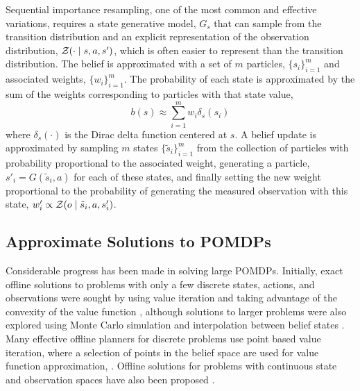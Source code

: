 Sequential importance resampling, one of the most common and effective variations, requires a state generative model, $G_s$ that can sample from the transition distribution and an explicit representation of the observation distribution, $\mathcal{Z}(\cdot \mid s, a, s')$, which is often easier to represent than the transition distribution.
The belief is approximated with a set of $m$ particles, $\{s_i\}_{i=1}^m$ and associated weights, $\{w_i\}_{i=1}^m$.
The probability of each state is approximated by the sum of the weights corresponding to particles with that state value,
\begin{equation}
    b(s) \approx \sum_{i=1}^m w_i \delta_s (s_i)
\end{equation}
where $\delta_s(\cdot)$ is the Dirac delta function centered at $s$.
A belief update is approximated by sampling $m$ states $\{\tilde{s}_i\}_{i=1}^m$ from the collection of particles with probability proportional to the associated weight, generating a particle, $s'_i = G(\tilde{s}_i, a)$ for each of these states, and finally setting the new weight proportional to the probability of generating the measured observation with this state, $w'_i \propto \mathcal{Z}(o \mid \tilde{s}_i, a, s'_i)$.

\subsection{Approximate Solutions to POMDPs} \label{sec:solutions}

Considerable progress has been made in solving large POMDPs.
Initially, exact offline solutions to problems with only a few discrete states, actions, and observations were sought by using value iteration and taking advantage of the convexity of the value function \cite{kaelbling1998planning}, although solutions to larger problems were also explored using Monte Carlo simulation and interpolation between belief states \cite{thrun1999monte}.
Many effective offline planners for discrete problems use point based value iteration, where a selection of points in the belief space are used for value function approximation,  \cite{kurniawati2008sarsop}.
Offline solutions for problems with continuous state and observation spaces have also been proposed \cite{bai2014integrated,brechtel2013solving}.

